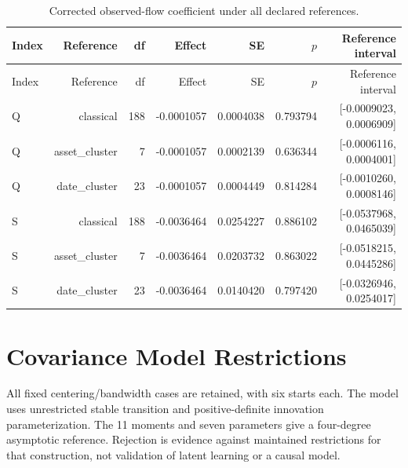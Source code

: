 \documentclass[10pt]{article}
\begin{document}
\small\setlength{\tabcolsep}{3pt}
\begin{longtable}{lrrrrrr}
\caption{Corrected observed-flow coefficient under all declared references.}\label{tab:fee_reference_intervals}\\
\toprule
Index & Reference & df & Effect & SE & $p$ & Reference interval \\\midrule\endfirsthead
\toprule
Index & Reference & df & Effect & SE & $p$ & Reference interval \\\midrule\endhead
Q & classical & 188 & -0.0001057 & 0.0004038 & 0.793794 & [-0.0009023, 0.0006909] \\
Q & asset\_cluster & 7 & -0.0001057 & 0.0002139 & 0.636344 & [-0.0006116, 0.0004001] \\
Q & date\_cluster & 23 & -0.0001057 & 0.0004449 & 0.814284 & [-0.0010260, 0.0008146] \\
S & classical & 188 & -0.0036464 & 0.0254227 & 0.886102 & [-0.0537968, 0.0465039] \\
S & asset\_cluster & 7 & -0.0036464 & 0.0203732 & 0.863022 & [-0.0518215, 0.0445286] \\
S & date\_cluster & 23 & -0.0036464 & 0.0140420 & 0.797420 & [-0.0326946, 0.0254017] \\
\bottomrule\end{longtable}\normalsize

\section{Covariance Model Restrictions}
All fixed centering/bandwidth cases are retained, with six starts each. The model uses unrestricted stable transition and positive-definite innovation parameterization. The 11 moments and seven parameters give a four-degree asymptotic reference. Rejection is evidence against maintained restrictions for that construction, not validation of latent learning or a causal model.
\end{document}
